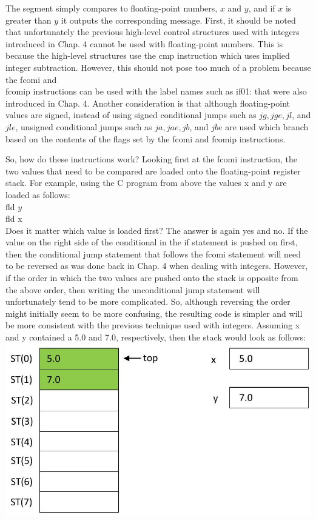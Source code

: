 \documentclass[10pt]{article}
\begin{document}
The segment simply compares to floating-point numbers, $x$ and $y$, and if $x$ is greater than $y$ it outputs the corresponding message. First, it should be noted that unfortunately the previous high-level control structures used with integers introduced in Chap. 4 cannot be used with floating-point numbers. This is because the high-level structures use the cmp instruction which uses implied integer subtraction. However, this should not pose too much of a problem because the fcomi and\\
fcomip instructions can be used with the label names such as if01: that were also introduced in Chap. 4. Another consideration is that although floating-point values are signed, instead of using signed conditional jumps such as $j g, j g e, j l$, and $j l e$, unsigned conditional jumps such as $j a, j a e, j b$, and $j b e$ are used which branch based on the contents of the flags set by the fcomi and fcomip instructions.

So, how do these instructions work? Looking first at the fcomi instruction, the two values that need to be compared are loaded onto the floating-point register stack. For example, using the C program from above the values x and y are loaded as follows:\\
fld $y$\\
fld x\\
Does it matter which value is loaded first? The answer is again yes and no. If the value on the right side of the conditional in the if statement is pushed on first, then the conditional jump statement that follows the fcomi statement will need to be reversed as was done back in Chap. 4 when dealing with integers. However, if the order in which the two values are pushed onto the stack is opposite from the above order, then writing the unconditional jump statement will unfortunately tend to be more complicated. So, although reversing the order might initially seem to be more confusing, the resulting code is simpler and will be more consistent with the previous technique used with integers. Assuming x and y contained a 5.0 and 7.0, respectively, then the stack would look as follows:\\
\includegraphics[max width=\textwidth, center]{2025_03_24_ebe50cc223a6fbc49eecg-238}
\end{document}

